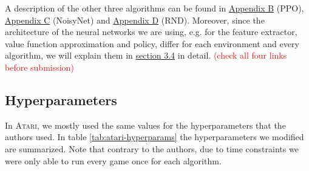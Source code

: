 \documentclass[10pt]{article} %
\begin{document}
\noindent A description of the other three algorithms can be found in \hyperlink{algo-ppo}{Appendix B} (PPO), \hyperlink{algo-noisynet}{Appendix C} (NoisyNet) and \hyperlink{algo-rnd}{Appendix D} (RND). Moreover, since the architecture of the neural networks we are using, e.g. for the feature extractor, value function approximation and policy, differ for each environment and every algorithm, we will explain them in \hyperlink{experimental-setup}{section 3.4} in detail. \textcolor{red}{(check all four links before submission)}



\hypertarget{hyperparameter-subsection}{\subsection{Hyperparameters}}

\noindent In \textsc{Atari}, we mostly used the same values for the hyperparameters that the authors used. In table \ref{tab:atari-hyperparams} the hyperparameters we modified are summarized. Note that contrary to the authors, due to time constraints we were only able to run every game once for each algorithm.
\end{document}
